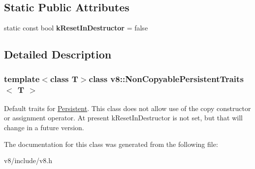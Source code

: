 \subsection*{Static Public Attributes}
\begin{DoxyCompactItemize}
\item 
\hypertarget{classv8_1_1NonCopyablePersistentTraits_a650880d85ff80634c30a195d20329681}{}static const bool {\bfseries k\+Reset\+In\+Destructor} = false\label{classv8_1_1NonCopyablePersistentTraits_a650880d85ff80634c30a195d20329681}

\end{DoxyCompactItemize}


\subsection{Detailed Description}
\subsubsection*{template$<$class T$>$class v8\+::\+Non\+Copyable\+Persistent\+Traits$<$ T $>$}

Default traits for \hyperlink{classv8_1_1Persistent}{Persistent}. This class does not allow use of the copy constructor or assignment operator. At present k\+Reset\+In\+Destructor is not set, but that will change in a future version. 

The documentation for this class was generated from the following file\+:\begin{DoxyCompactItemize}
\item 
v8/include/v8.\+h\end{DoxyCompactItemize}
